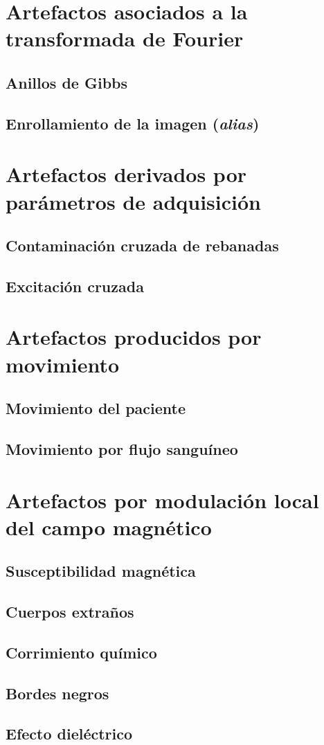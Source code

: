 \section{Artefactos asociados a la transformada de Fourier}
\subsection{Anillos de Gibbs}
\subsection{Enrollamiento de la imagen (\textit{alias})}


\section{Artefactos derivados por parámetros de adquisición}
\subsection{Contaminación cruzada de rebanadas}
\subsection{Excitación cruzada}

\section{Artefactos producidos por movimiento}
\subsection{Movimiento del paciente}
\subsection{Movimiento por flujo sanguíneo}

\section{Artefactos por modulación local del campo magnético}
\subsection{Susceptibilidad magnética}
\subsection{Cuerpos extraños}
\subsection{Corrimiento químico}
\subsection{Bordes negros}
\subsection{Efecto dieléctrico}


